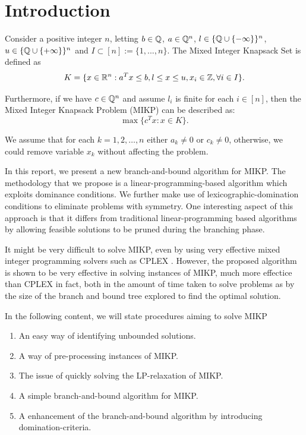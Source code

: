\documentclass[a4paper,11pt]{article}
\begin{document}


\tableofcontents
\newpage

\section{Introduction} 
Consider a positive integer $n$, letting $b\in\mathbb{Q}$, $a\in \mathbb{Q}^n$, $l\in \{\mathbb{Q}\cup \{-\infty\}\}^n$, $u\in \{\mathbb{Q}\cup \{+\infty\}\}^n$ and $I\subset [n] :=
\{1,...,n\}$. The Mixed Integer Knapsack Set is defined as
\begin{equation}\label{K}
 K=\{x\in \mathbb{R}^n : a^Tx\leq b, l\leq x\leq u, x_i\in \mathbb{Z}, \forall i\in I\}.
\end{equation}

Furthermore, if we have $c\in \mathbb{Q}^n$ and assume $l_i$ is finite for each $i\in [n]$, then the Mixed Integer Knapsack Problem (MIKP) can be 
described as:
\begin{equation}\label{MIKP}
 \max \{c^Tx:x\in K\}.
\end{equation}

We assume that for each $k=1,2,\dots,n$ either $a_k\neq 0$ or $c_k\neq 0$, otherwise, we could remove variable $x_k$ without affecting the problem.

In this report, we present a new branch-and-bound algorithm for MIKP. The methodology that we propose is a linear-programming-based algorithm which exploits dominance conditions. We further make use of lexicographic-domination conditions to eliminate problems with symmetry. One interesting aspect of this approach is that it differs from traditional linear-programming based algorithms by allowing feasible solutions to be pruned during the branching phase.

It might be very difficult to solve MIKP, even by using very effective mixed integer programming solvers such as CPLEX \cite{cplex2005high}. However, the proposed algorithm is shown to be very effective in solving instances of MIKP, much more effectice than CPLEX in fact, both in the amount of time taken to solve problems as by the size of the branch and bound tree explored to find the optimal solution.

In the following content, we will state procedures aiming to solve MIKP
\begin{enumerate}
\item An easy way of identifying unbounded solutions.
\item A way of pre-processing instances of MIKP.
\item The issue of quickly solving the LP-relaxation of MIKP.
\item A simple branch-and-bound algorithm for MIKP.
\item A enhancement of the branch-and-bound algorithm by introducing domination-criteria.
\end{enumerate} 
\end{document}
